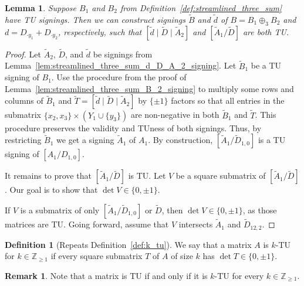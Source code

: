 \documentclass{article}
\newtheorem{lemma}{Lemma}
\theoremstyle{definition}
\newtheorem{definition}{Definition}
\newtheorem{remark}{Remark}
\begin{document}
\begin{lemma}\label{lem:streamlined_three_sum_B_d_signing}
    Suppose $B_{1}$ and $B_{2}$ from Definition~\ref{def:streamlined_three_sum} have TU signings. Then we can construct signings $\tilde{B}$ and $\tilde{d}$ of $B = B_{1} \oplus_{3} B_{2}$ and $d = D_{\cdot y_{1}} + D_{\cdot y_{2}}$, respectively, such that $[\tilde{d} \mid \tilde{D} \mid \tilde{A}_{2}]$ and $[\tilde{A}_{1} / \tilde{D}]$ are both TU.
\end{lemma}

\begin{proof}
    Let $\tilde{A}_{2}$, $\tilde{D}$, and $\tilde{d}$ be signings from Lemma~\ref{lem:streamlined_three_sum_d_D_A_2_signing}. Let $\tilde{B}_{1}$ be a TU signing of $B_{1}$. Use the procedure from the proof of Lemma~\ref{lem:streamlined_three_sum_B_2_signing} to multiply some rows and columns of $\tilde{B}_{1}$ and $\tilde{T} = [\tilde{d} \mid \tilde{D} \mid \tilde{A}_{2}]$ by $\{\pm 1\}$ factors so that all entries in the submatrix $\{x_{2}, x_{3}\} \times (Y_{1} \cup \{y_{3}\})$ are non-negative in both $\tilde{B}_{1}$ and $\tilde{T}$. This procedure preserves the validity and TUness of both signings. Thus, by restricting $\tilde{B}_{1}$ we get a signing $\tilde{A}_{1}$ of $A_{1}$. By construction, $[\tilde{A}_{1} / \tilde{D}_{1, 0}]$ is a TU signing of $[A_{1} / D_{1, 0}]$.

    It remains to prove that $[\tilde{A}_{1} / \tilde{D}]$ is TU. Let $V$ be a square submatrix of $[\tilde{A}_{1} / \tilde{D}]$. Our goal is to show that $\det V \in \{0, \pm 1\}$.

    If $V$ is a submatrix of only $[\tilde{A}_{1} / \tilde{D}_{1, 0}]$ or $\tilde{D}$, then $\det V \in \{0, \pm 1\}$, as those matrices are TU. Going forward, assume that $V$ intersects $\tilde{A}_{1}$ and $\tilde{D}_{12, 2}$. 
\end{proof}

\begin{definition}[Repeats Definition~\ref{def:k_tu}]\label{def:streamlined_three_sum_k_tu}
    We say that a matrix $A$ is $k$-TU for $k \in \mathbb{Z}_{\geq 1}$ if every square submatrix $T$ of $A$ of size $k$ has $\det T \in \{0, \pm 1\}$.
\end{definition}

\begin{remark}
    Note that a matrix is TU if and only if it is $k$-TU for every $k \in \mathbb{Z}_{\geq 1}$.
\end{remark}
\end{document}
